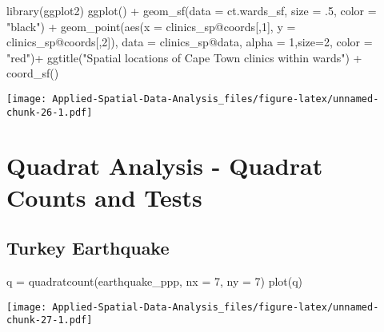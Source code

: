 \documentclass[
]{book}
\newenvironment{Shaded}{\begin{snugshade}}{\end{snugshade}}
\newcommand{\AttributeTok}[1]{\textcolor[rgb]{0.77,0.63,0.00}{#1}}
\newcommand{\DecValTok}[1]{\textcolor[rgb]{0.00,0.00,0.81}{#1}}
\newcommand{\FunctionTok}[1]{\textcolor[rgb]{0.00,0.00,0.00}{#1}}
\newcommand{\NormalTok}[1]{#1}
\newcommand{\OtherTok}[1]{\textcolor[rgb]{0.56,0.35,0.01}{#1}}
\newcommand{\SpecialCharTok}[1]{\textcolor[rgb]{0.00,0.00,0.00}{#1}}
\newcommand{\StringTok}[1]{\textcolor[rgb]{0.31,0.60,0.02}{#1}}
\begin{document}
\begin{Shaded}
\begin{Highlighting}[]
\FunctionTok{library}\NormalTok{(ggplot2)}
\FunctionTok{ggplot}\NormalTok{() }\SpecialCharTok{+} 
  \FunctionTok{geom\_sf}\NormalTok{(}\AttributeTok{data =}\NormalTok{ ct.wards\_sf, }\AttributeTok{size =}\NormalTok{ .}\DecValTok{5}\NormalTok{, }\AttributeTok{color =} \StringTok{"black"}\NormalTok{) }\SpecialCharTok{+} 
  \FunctionTok{geom\_point}\NormalTok{(}\FunctionTok{aes}\NormalTok{(}\AttributeTok{x =}\NormalTok{ clinics\_sp}\SpecialCharTok{@}\NormalTok{coords[,}\DecValTok{1}\NormalTok{], }\AttributeTok{y =}\NormalTok{ clinics\_sp}\SpecialCharTok{@}\NormalTok{coords[,}\DecValTok{2}\NormalTok{]),}
             \AttributeTok{data =}\NormalTok{ clinics\_sp}\SpecialCharTok{@}\NormalTok{data, }\AttributeTok{alpha =} \DecValTok{1}\NormalTok{,}\AttributeTok{size=}\DecValTok{2}\NormalTok{, }\AttributeTok{color =} \StringTok{"red"}\NormalTok{)}\SpecialCharTok{+} 
  \FunctionTok{ggtitle}\NormalTok{(}\StringTok{"Spatial locations of Cape Town clinics within wards"}\NormalTok{) }\SpecialCharTok{+} 
  \FunctionTok{coord\_sf}\NormalTok{()}
\end{Highlighting}
\end{Shaded}

\texttt{[image: Applied-Spatial-Data-Analysis\_files/figure-latex/unnamed-chunk-26-1.pdf]}

\hypertarget{quadrat-analysis---quadrat-counts-and-tests}{%
\section{Quadrat Analysis - Quadrat Counts and Tests}\label{quadrat-analysis---quadrat-counts-and-tests}}

\hypertarget{turkey-earthquake}{%
\subsection{Turkey Earthquake}\label{turkey-earthquake}}

\begin{Shaded}
\begin{Highlighting}[]
\NormalTok{q }\OtherTok{=} \FunctionTok{quadratcount}\NormalTok{(earthquake\_ppp, }\AttributeTok{nx =} \DecValTok{7}\NormalTok{, }\AttributeTok{ny =} \DecValTok{7}\NormalTok{)}
\FunctionTok{plot}\NormalTok{(q)}
\end{Highlighting}
\end{Shaded}

\texttt{[image: Applied-Spatial-Data-Analysis\_files/figure-latex/unnamed-chunk-27-1.pdf]}
\end{document}
